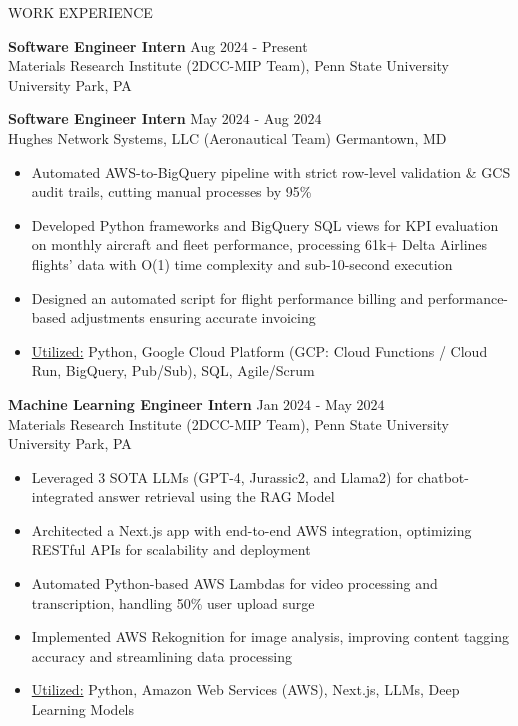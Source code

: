\documentclass{resume} %
\begin{document}
\begin{rSection}{WORK EXPERIENCE}

{\bf Software Engineer Intern} \hfill Aug $2024$ - Present\\
Materials Research Institute (2DCC-MIP Team), Penn State University \hfill University Park, PA
    
{\bf Software Engineer Intern} \hfill May $2024$ - Aug $2024$\\
Hughes Network Systems, LLC (Aeronautical Team) \hfill Germantown, MD
\begin{itemize}[itemsep = -4pt]
    \item Automated AWS-to-BigQuery pipeline with strict row-level validation \& GCS audit trails, cutting manual processes by 95\%
    \item Developed Python frameworks and BigQuery SQL views for KPI evaluation on monthly aircraft and fleet performance, processing 61k+ Delta Airlines flights' data with O(1) time complexity and sub-10-second execution
    \item Designed an automated script for flight performance billing and performance-based adjustments ensuring accurate invoicing
    \item \underline{Utilized:} Python, Google Cloud Platform (GCP: Cloud Functions / Cloud Run, BigQuery, Pub/Sub), SQL, Agile/Scrum
\end{itemize}

{\bf Machine Learning Engineer Intern} \hfill Jan $2024$ - May $2024$\\
Materials Research Institute (2DCC-MIP Team), Penn State University \hfill University Park, PA
\begin{itemize}[itemsep = -4pt]
    \item Leveraged 3 SOTA LLMs (GPT-4, Jurassic2, and Llama2) for chatbot-integrated answer retrieval using the RAG Model
    \item Architected a Next.js app with end-to-end AWS integration, optimizing RESTful APIs for scalability and deployment
    \item Automated Python-based AWS Lambdas for video processing and transcription, handling 50\% user upload surge
    \item Implemented AWS Rekognition for image analysis, improving content tagging accuracy and streamlining data processing
    \item \underline{Utilized:} Python, Amazon Web Services (AWS), Next.js, LLMs, Deep Learning Models 
\end{itemize}


\end{rSection}
\end{document}
